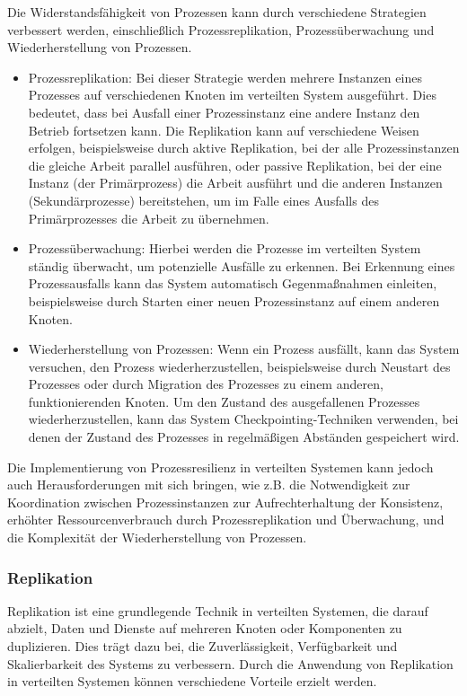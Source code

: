 Die Widerstandsfähigkeit von Prozessen kann durch verschiedene Strategien verbessert werden, einschließlich Prozessreplikation, Prozessüberwachung und Wiederherstellung von Prozessen.
\begin{itemize}
\item Prozessreplikation: Bei dieser Strategie werden mehrere Instanzen eines Prozesses auf verschiedenen Knoten im verteilten System ausgeführt. Dies bedeutet, dass bei Ausfall einer Prozessinstanz eine andere Instanz den Betrieb fortsetzen kann. Die Replikation kann auf verschiedene Weisen erfolgen, beispielsweise durch aktive Replikation, bei der alle Prozessinstanzen die gleiche Arbeit parallel ausführen, oder passive Replikation, bei der eine Instanz (der Primärprozess) die Arbeit ausführt und die anderen Instanzen (Sekundärprozesse) bereitstehen, um im Falle eines Ausfalls des Primärprozesses die Arbeit zu übernehmen.
\item Prozessüberwachung: Hierbei werden die Prozesse im verteilten System ständig überwacht, um potenzielle Ausfälle zu erkennen. Bei Erkennung eines Prozessausfalls kann das System automatisch Gegenmaßnahmen einleiten, beispielsweise durch Starten einer neuen Prozessinstanz auf einem anderen Knoten.
\item Wiederherstellung von Prozessen: Wenn ein Prozess ausfällt, kann das System versuchen, den Prozess wiederherzustellen, beispielsweise durch Neustart des Prozesses oder durch Migration des Prozesses zu einem anderen, funktionierenden Knoten. Um den Zustand des ausgefallenen Prozesses wiederherzustellen, kann das System Checkpointing-Techniken verwenden, bei denen der Zustand des Prozesses in regelmäßigen Abständen gespeichert wird.
\end{itemize}
Die Implementierung von Prozessresilienz in verteilten Systemen kann jedoch auch Herausforderungen mit sich bringen, wie z.B. die Notwendigkeit zur Koordination zwischen Prozessinstanzen zur Aufrechterhaltung der Konsistenz, erhöhter Ressourcenverbrauch durch Prozessreplikation und Überwachung, und die Komplexität der Wiederherstellung von Prozessen. 

\subsubsection{Replikation}

Replikation ist eine grundlegende Technik in verteilten Systemen, die darauf abzielt, Daten und Dienste auf mehreren Knoten oder Komponenten zu duplizieren. Dies trägt dazu bei, die Zuverlässigkeit, Verfügbarkeit und Skalierbarkeit des Systems zu verbessern. Durch die Anwendung von Replikation in verteilten Systemen können verschiedene Vorteile erzielt werden.

